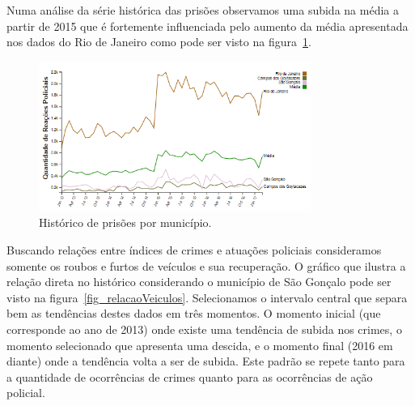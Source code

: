 \documentclass[10pt,conference]{IEEEtran}
\begin{document}
Numa análise da série histórica das prisões observamos uma subida na média a partir de 2015 que é fortemente influenciada pelo aumento da média apresentada nos dados do Rio de Janeiro como pode ser visto na figura~\ref{fig_temporalPrisoes}.

\begin{figure}[!t]
\centering
\includegraphics[width=3.5in]{serieTemporalPrisoesPorMunicipio.png}
\caption{Histórico de prisões por município.}
\label{fig_temporalPrisoes}
\end{figure}

Buscando relações entre índices de crimes e atuações policiais consideramos somente os roubos e furtos de veículos e sua recuperação. O gráfico que ilustra a relação direta no histórico considerando o município de São Gonçalo pode ser visto na figura~\ref{fig_relacaoVeiculos}. Selecionamos o intervalo central que separa bem as tendências destes dados em três momentos. O momento inicial (que corresponde ao ano de 2013) onde existe uma tendência de subida nos crimes, o momento selecionado que apresenta uma descida, e o momento final (2016 em diante) onde a tendência volta a ser de subida. Este padrão se repete tanto para a quantidade de ocorrências de crimes quanto para as ocorrências de ação policial.
\end{document}
